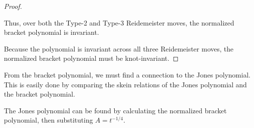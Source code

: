 \documentclass[12pt]{article}
\newenvironment{theorem}[2][Theorem]{\begin{trivlist}
\item[\hskip \labelsep {\bfseries #1}\hskip \labelsep {\bfseries #2.}]}{\end{trivlist}}
\begin{document}
\begin{proof}
\begin{itemize}
Thus, over both the Type-2 and Type-3 Reidemeister moves, the normalized bracket polynomial is invariant. 


\end{itemize}

Because the polynomial is invariant across all three Reidemeister moves, the normalized bracket polynomial must be knot-invariant. 

\end{proof}

From the bracket polynomial, we must find a connection to the Jones polynomial. This is easily done by comparing the skein relations of the Jones polynomial and the bracket polynomial. 

\begin{theorem}{3.2}[3]

The Jones polynomial can be found by calculating the normalized bracket polynomial, then substituting $A = t^{-1/4}$. 

\end{theorem}
\end{document}
